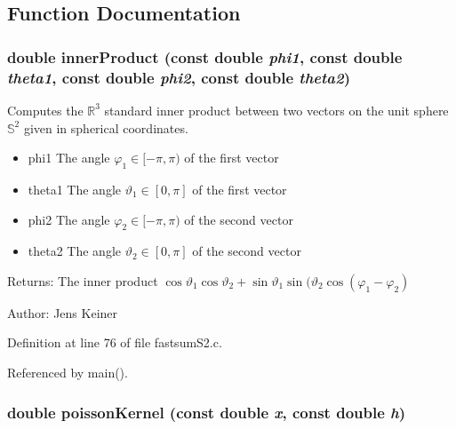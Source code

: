 \subsection{Function Documentation}
\hypertarget{group__applications__fastsumS2__test_ga0}{
\subsubsection[innerProduct]{\setlength{\rightskip}{0pt plus 5cm}double inner\-Product (const double {\em phi1}, const double {\em theta1}, const double {\em phi2}, const double {\em theta2})}}
\label{group__applications__fastsumS2__test_ga0}


Computes the $\mathbb{R}^3$ standard inner product between two vectors on the unit sphere $\mathbb{S}^2$ given in spherical coordinates. 

\begin{itemize}
\item phi1 The angle $\varphi_1 \in [-\pi,\pi)$ of the first vector \item theta1 The angle $\vartheta_1 \in [0,\pi]$ of the first vector \item phi2 The angle $\varphi_2 \in [-\pi,\pi)$ of the second vector \item theta2 The angle $\vartheta_2 \in [0,\pi]$ of the second vector\end{itemize}
\begin{Desc}
\item[Returns:]The inner product $\cos \vartheta_1 \cos \vartheta_2 + \sin \vartheta_1 \sin(\vartheta_2 \cos(\varphi_1 - \varphi_2)$\end{Desc}
\begin{Desc}
\item[Author:]Jens Keiner \end{Desc}


Definition at line 76 of file fastsum\-S2.c.

Referenced by main().\hypertarget{group__applications__fastsumS2__test_ga1}{
\subsubsection[poissonKernel]{\setlength{\rightskip}{0pt plus 5cm}double poisson\-Kernel (const double {\em x}, const double {\em h})}}
\label{group__applications__fastsumS2__test_ga1}


